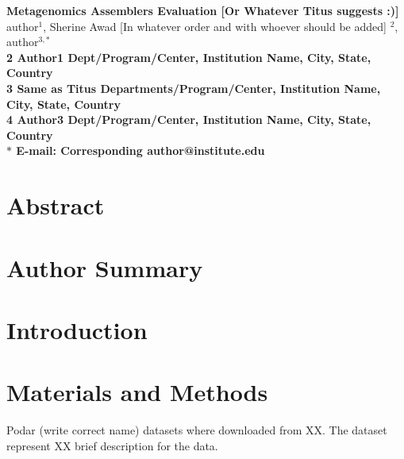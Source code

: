 





\begin{flushleft}
{\Large
\textbf{Metagenomics Assemblers Evaluation [Or Whatever Titus suggests :)] }
}
\\
 
author$^{1}$, 
Sherine Awad [In whatever order and with whoever should be added] $^{2}$, 
author$^{3,\ast}$
\\
\bf{2} Author1  Dept/Program/Center, Institution Name, City, State, Country
\\
\bf{3} Same as Titus Departments/Program/Center, Institution Name, City, State, Country
\\
\bf{4} Author3 Dept/Program/Center, Institution Name, City, State, Country
\\
$\ast$ E-mail: Corresponding author@institute.edu
\end{flushleft}

\section*{Abstract}

\section*{Author Summary}



\section*{Introduction}




\section*{Materials and Methods}
Podar (write correct name) datasets where downloaded from XX. The dataset represent XX brief description for the data. 


